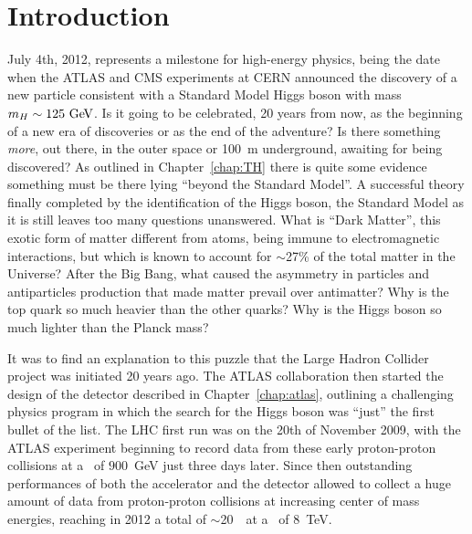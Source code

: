 \clearpage{\pagestyle{empty}\cleardoublepage}

\chapter*{Introduction}\label{chap:intro}


July 4th, 2012, represents a milestone for high-energy physics,
being the date when the ATLAS and CMS experiments at CERN announced
the discovery of a new particle consistent with a Standard Model Higgs
boson with mass $m_H\sim 125\gev$. Is it going to be celebrated, 20 years
from now, as the beginning of a new era of discoveries or as the 
end of the adventure? Is there something {\it more}, out there, in 
the outer space or 100~m underground, awaiting for being discovered?
As outlined in Chapter~\ref{chap:TH} there is quite some evidence
something must be there lying ``beyond the Standard Model''. 
A successful theory finally completed
by the identification of the Higgs boson, 
the Standard Model as it is still leaves too many questions
unanswered. What is ``Dark Matter'', this exotic form of matter different
from atoms, being immune to electromagnetic interactions, but which
is known to account for $\sim$27\% of the total matter in the Universe?
After the Big Bang, what caused the asymmetry in particles and
antiparticles production that made matter prevail over antimatter?
Why is the top quark so much heavier than the other quarks? Why is the
Higgs boson so much lighter than the Planck mass?

It was to find an explanation to this puzzle that the 
Large Hadron Collider project was initiated 20 years ago. The ATLAS
collaboration then started the design of the detector described in
Chapter~\ref{chap:atlas}, outlining a challenging physics program
in which the search for the Higgs boson was ``just'' the first bullet
of the list.
The LHC first run was on the 20th of November 2009, with the ATLAS
experiment beginning to record data from these early proton-proton
collisions at a \cme\ of $900$~GeV just three days later.
Since then outstanding performances of both the accelerator
and the detector allowed to collect a huge amount of data
from proton-proton collisions at increasing center of mass energies, reaching in
2012 a total of $\sim$20~\ifb\ at a \cme\ of 8~TeV.

